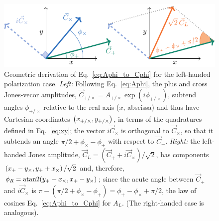 \documentclass[aps,prd,twocolumn,superscriptaddress,preprintnumbers,floatfix,nofootinbib]{revtex4-2}
\begin{document}
\begin{figure}
\includegraphics[width=\columnwidth]{diagram_apac}
\caption{Geometric derivation of Eq.~\eqref{eq:Aphi_to_Cphi} for the left-handed polarization case.
\emph{Left:} Following Eq.~\eqref{eq:Aphi}, the plus and cross Jones-vecor amplitudes, $\vec{C}_{+/\times} = A_{+/\times} \exp(i \phi_{+/\times})$, subtend angles $\phi_{+/\times}$ relative to the real axis ($x$, abscissa) and thus have Cartesian coordinates $\left(x_{+/\times}, y_{+/\times} \right)$, in terms of the quadratures defined in Eq.~\eqref{eq:xy}; the vector $i\vec{C}_\times$ is orthogonal to $\vec{C}_\times$, so that it subtends an angle $\pi/2 + \phi_\times-\phi_+$ with respect to $\vec{C}_+$.
\emph{Right:} the left-handed Jones amplitude, $\vec{C}_L = (\vec{C}_+ + i \vec{C}_\times)/\sqrt{2}$, has components $\left(x_{+} - y_{\times}, y_{+} + x_{\times}\right)/\sqrt{2}$ and, therefore, $\phi_R = \mathrm{atan2}( y_{+} + x_{\times}, x_{+} - y_{\times})$; since the acute angle between $\vec{C}_+$ and $i\vec{C}_\times$ is $\pi - (\pi /2 + \phi_\times - \phi_+) = \phi_+ - \phi_\times + \pi/2$, the law of cosines Eq.~\eqref{eq:Aphi_to_Cphi} for $A_L$. (The right-handed case is analogous).
}
\label{fig:diagram_apac}
\end{figure}
\end{document}
